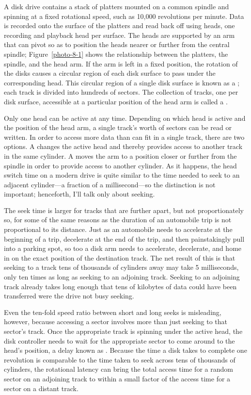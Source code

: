 A disk drive contains a stack of platters mounted on a common spindle
and spinning at a fixed rotational speed, such as 10,000 revolutions
per minute.  Data is recorded onto the surface of the platters and
read back off using heads, one recording and playback head per
surface.  The heads are supported by an arm that can pivot so as to
position the heads nearer or further from the central spindle;
Figure~\ref{photo-8-1} shows the relationship between the platters,
the spindle, and the head arm.
If the
arm is left in a fixed position, the rotation of the disks causes a
circular region of each disk surface to pass under the corresponding
head.  This circular region of a single disk surface is known as a
; each track is divided into hundreds of sectors.  The
collection of tracks, one per disk surface, accessible at a particular
position of the head arm is called a .

Only one head can be active at any time.  Depending on which head is active
and the position of the head arm, a single track's worth of sectors can
be read or written.
In order to access more data than can fit in a single track, there are
two options.  A  changes the active head and
thereby provides access to another track in
the same cylinder.  A  moves the arm to a position closer or further
from the spindle in order to provide access to another cylinder.  As it happens, the head switch time on a modern
drive is quite similar to the time needed to seek to an adjacent
cylinder---a fraction of a millisecond---so the distinction is not important; henceforth, I'll talk
only about seeking.

The seek time is larger for tracks that are further apart, but not
proportionately so, for some of the same reasons as the duration of an
automobile trip is not proportional to its distance.  Just as an
automobile needs to accelerate at the beginning of a trip, decelerate
at the end of the trip, and then painstakingly pull into a parking
spot, so too a disk arm needs to accelerate, decelerate, and home in
on the exact position of the destination track.  The net result of
this is that seeking to a track tens of thousands of cylinders away
may take 5 milliseconds, only ten times as long as seeking to an adjoining track.
Seeking to an adjoining track already takes long enough that tens of
kilobytes of data could have been transferred were the drive not busy
seeking.

Even the ten-fold speed ratio between short and long seeks is
misleading, however, because accessing a sector involves more than
just seeking to that sector's track.  Once the appropriate track is
spinning under the active head, the disk controller needs to wait for
the appropriate sector to come around to the head's position, a delay
known as .  Because the time a disk
takes to complete one revolution is comparable to the time taken to
seek across tens of thousands of cylinders, the rotational latency can
bring the total access time for a random sector on an adjoining track
to within a small factor of the access time for a sector on a distant
track.

